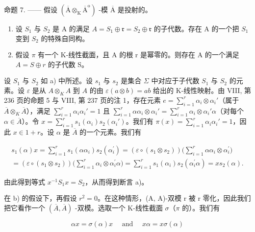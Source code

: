 命题 7. —— 假设 \((\overline{\mathrm{A}}\otimes_{\mathrm{K}}\overline{\mathrm{A}}^{\mathrm{o}})\) -模 \(\overline{\mathrm{A}}\) 是投射的。

\begin{enumerate}
\def\labelenumi{\alph{enumi})}
\item
  设 \(S_1\) 与 \(S_2\) 是 A 的满足 \(A = S_1 \oplus \mathfrak{r} = S_2 \oplus \mathfrak{r}\) 的子代数。存在 A 的一个把 \(S_1\) 变到 \(S_2\) 的特殊自同构。
\item
  假设 \(\pi\) 有一个 K-线性截面，且 A 的根 r 是幂零的。则存在 A 的一个满足 \(A = S \oplus r\) 的子代数 S。
\end{enumerate}

设 \(S_{1}\) 与 \(S_{2}\) 如 a) 中所述。设 \(s_{1}\) 与 \(s_{2}\) 是集合 \(\Sigma\) 中对应于子代数 \(S_{1}\) 与 \(S_{2}\) 的元素。设 \(\varepsilon\) 是从 \(A \otimes_{K} A\) 到 \(A\) 的由 \(\varepsilon(a \otimes b) = ab\) 给出的 K-线性映射。由 VIII, 第 236 页的命题 5 与 VIII, 第 237 页的注 1，存在元素 \(e = \sum_{i=1}^{r} \alpha_{i} \otimes \alpha_{i}'\)（属于 \(\overline{A} \otimes_{K} \overline{A}\)），满足 \(\sum_{i=1}^{r} \alpha_{i} \alpha_{i}' = 1\) 且 \(\sum_{i=1}^{r} \alpha \alpha_{i} \otimes \alpha_{i}' = \sum_{i=1}^{r} \alpha_{i} \otimes \alpha_{i}' \alpha\)（对每个 \(\alpha \in \overline{A}\)）。令 \(x = \sum_{i=1}^{r} s_{1}(\alpha_{i}) s_{2}(\alpha_{i}')\)。我们有 \(\pi(x) = \sum_{i=1}^{r} \alpha_{i} \alpha_{i}' = 1\)，因此 \(x \in 1 + r\)。设 \(\alpha\) 是 \(\overline{A}\) 的一个元素。我们有

\[
\begin{array}{l} s _ {1} (\alpha) x = \sum_ {i = 1} ^ {r} s _ {1} (\alpha \alpha_ {i}) s _ {2} (\alpha_ {i} ^ {\prime}) = (\varepsilon \circ (s _ {1} \otimes s _ {2})) \biggl (\sum_ {i = 1} ^ {r} \alpha \alpha_ {i} \otimes \alpha_ {i} ^ {\prime} \biggr) \\ = (\varepsilon \circ (s _ {1} \otimes s _ {2})) \biggl (\sum_ {i = 1} ^ {r} \alpha_ {i} \otimes \alpha_ {i} ^ {\prime} \alpha \biggr) = \sum_ {i = 1} ^ {r} s _ {1} (\alpha_ {i}) s _ {2} (\alpha_ {i} ^ {\prime} \alpha) = x s _ {2} (\alpha). \end{array}
\]

由此得到等式 \(x^{-1}S_{1}x = S_{2}\)，从而得到断言 a)。

在 b) 的假设下，再假设 \(r^{2}=0\)。在这种情形，(A, A)-双模 r 被 r 零化，因此我们把它看作一个 \((\overline{A},\overline{A})\) -双模。选取一个 K-线性截面 \(\sigma\)（\(\pi\) 的）。我们有

\[
\alpha x = \sigma (\alpha) x \quad \text { and } \quad x \alpha = x \sigma (\alpha)\tag{19}
\]

